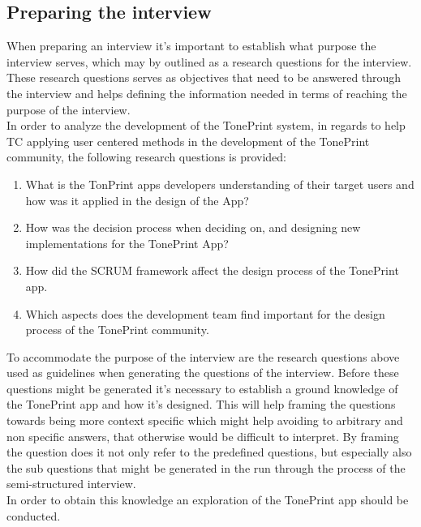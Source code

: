 \subsection{Preparing the interview}
\label{PreparingTheInterview}
%
When preparing an interview it's important to establish what purpose the interview serves, which may by outlined as a research questions for the interview. These research questions serves as objectives that need to be answered through the interview and helps defining the information needed in terms of reaching the purpose of the interview. \\
In order to analyze the development of the TonePrint system, in regards to help TC applying user centered methods in the development of the TonePrint community, the following research questions is provided:
\begin{enumerate}
	\item What is the TonPrint apps developers understanding of their target users and how was it applied in the design of the App?
	\item How was the decision process when deciding on, and designing new implementations for the TonePrint App?
	\item How did the SCRUM framework affect the design process of the TonePrint app.
	\item Which aspects does the development team find important for the design process of the TonePrint community. 
\end{enumerate}

\noindent
To accommodate the purpose of the interview are the research questions above used as guidelines when generating the questions of the interview. Before these questions might be generated it's necessary to establish a ground knowledge of the TonePrint app and how it's designed. This will help framing the questions towards being more context specific which might help avoiding to arbitrary and non specific answers, that otherwise would be difficult to interpret. By framing the question does it not only refer to the predefined questions, but especially also the sub questions that might be generated in the run through the process of the semi-structured interview. \\
In order to obtain this knowledge an exploration of the TonePrint app should be conducted.


